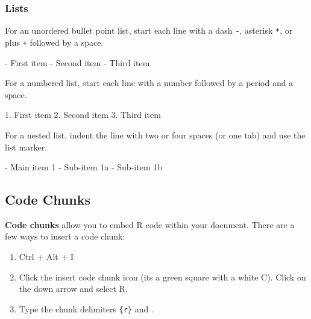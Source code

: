 \documentclass[
]{book}
\newenvironment{Shaded}{\begin{snugshade}}{\end{snugshade}}
\newcommand{\NormalTok}[1]{#1}
\providecommand{\tightlist}{%
  \setlength{\itemsep}{0pt}\setlength{\parskip}{0pt}}
\theoremstyle{definition}
\theoremstyle{definition}
\theoremstyle{definition}
\theoremstyle{definition}
\theoremstyle{remark}
\begin{document}
\hypertarget{lists-1}{%
\subsubsection{Lists}\label{lists-1}}

For an unordered bullet point list, start each line with a dash \texttt{-}, asterisk \texttt{*}, or plus \texttt{+} followed by a space.

\begin{Shaded}
\begin{Highlighting}[]
\NormalTok{{-} First item}
\NormalTok{{-} Second item}
\NormalTok{{-} Third item}
\end{Highlighting}
\end{Shaded}

For a numbered list, start each line with a number followed by a period and a space.

\begin{Shaded}
\begin{Highlighting}[]
\NormalTok{1. First item}
\NormalTok{2. Second item}
\NormalTok{3. Third item}
\end{Highlighting}
\end{Shaded}

For a nested list, indent the line with two or four spaces (or one tab) and use the list marker.

\begin{Shaded}
\begin{Highlighting}[]
\NormalTok{{-} Main item 1}
\NormalTok{    {-} Sub{-}item 1a}
\NormalTok{    {-} Sub{-}item 1b}
\end{Highlighting}
\end{Shaded}

\hypertarget{code-chunks}{%
\subsection{Code Chunks}\label{code-chunks}}

\textbf{Code chunks} allow you to embed R code within your document. There are a few ways to insert a code chunk:

\begin{enumerate}
\def\labelenumi{\arabic{enumi}.}
\tightlist
\item
  Ctrl + Alt + I
\item
  Click the insert code chunk icon (its a green square with a white C). Click on the down arrow and select R.
\item
  Type the chunk delimiters \texttt{\textasciigrave{}\textasciigrave{}\textasciigrave{}\{r\}} and \texttt{\textasciigrave{}\textasciigrave{}\textasciigrave{}}.
\end{enumerate}
\end{document}
